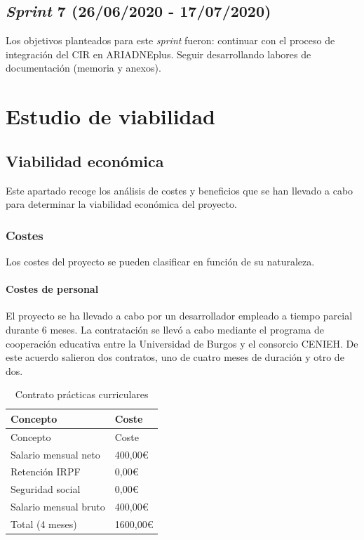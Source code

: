 \documentclass[
]{article}
\begin{document}
\hypertarget{sprint-7-26062020---17072020}{%
\subsection{\texorpdfstring{\emph{Sprint} 7 (26/06/2020 -
17/07/2020)}{Sprint 7 (26/06/2020 - 17/07/2020)}}\label{sprint-7-26062020---17072020}}

Los objetivos planteados para este \emph{sprint} fueron: continuar con
el proceso de integración del CIR en ARIADNEplus. Seguir desarrollando
labores de documentación (memoria y anexos).

\hypertarget{estudio-de-viabilidad}{%
\section{Estudio de viabilidad}\label{estudio-de-viabilidad}}

\hypertarget{viabilidad-econuxf3mica}{%
\subsection{Viabilidad económica}\label{viabilidad-econuxf3mica}}

Este apartado recoge los análisis de costes y beneficios que se han
llevado a cabo para determinar la viabilidad económica del proyecto.

\hypertarget{costes}{%
\subsubsection{Costes}\label{costes}}

Los costes del proyecto se pueden clasificar en función de su
naturaleza.

\hypertarget{costes-de-personal}{%
\paragraph{Costes de personal}\label{costes-de-personal}}

El proyecto se ha llevado a cabo por un desarrollador empleado a tiempo
parcial durante 6 meses. La contratación se llevó a cabo mediante el
programa de cooperación educativa entre la Universidad de Burgos y el
consorcio CENIEH. De este acuerdo salieron dos contratos, uno de cuatro
meses de duración y otro de dos.

\begin{longtable}[]{@{}ll@{}}
\caption{Contrato prácticas curriculares}\tabularnewline
\toprule
Concepto & Coste\tabularnewline
\midrule
\endfirsthead
\toprule
Concepto & Coste\tabularnewline
\midrule
\endhead
Salario mensual neto & 400,00€\tabularnewline
Retención IRPF & 0,00€\tabularnewline
Seguridad social & 0,00€\tabularnewline
Salario mensual bruto & 400,00€\tabularnewline
Total (4 meses) & 1600,00€\tabularnewline
\bottomrule
\end{longtable}
\end{document}
